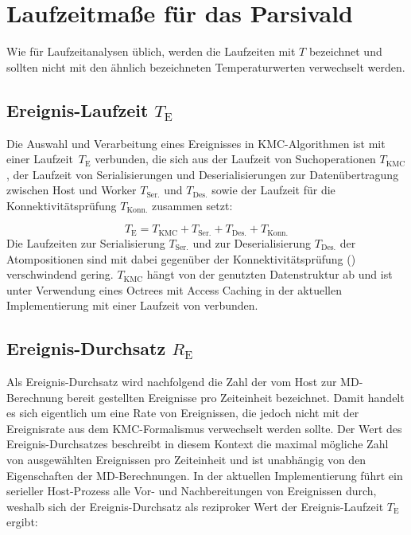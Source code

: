 \section{Laufzeitmaße für das Parsivald}

Wie für Laufzeitanalysen üblich, werden die Laufzeiten mit $T$ bezeichnet und sollten nicht mit den ähnlich bezeichneten Temperaturwerten verwechselt werden.

\subsection{Ereignis-Laufzeit $T_\text{E}$}

Die Auswahl und Verarbeitung eines Ereignisses in KMC-Algorithmen ist mit einer Laufzeit~$T_\text{E}$ verbunden, die sich aus der Laufzeit von Suchoperationen $T_\text{KMC}$, der Laufzeit von Serialisierungen und Deserialisierungen zur Datenübertragung zwischen Host und Worker $T_\text{Ser.}$ und $T_\text{Des.}$ sowie der Laufzeit für die Konnektivitätsprüfung $T_\text{Konn.}$ zusammen setzt:

\begin{equation}
T_\text{E} = T_\text{KMC} + T_\text{Ser.} + T_\text{Des.} + T_\text{Konn.}
\end{equation}
Die Laufzeiten zur Serialisierung $T_\text{Ser.}$ und zur Deserialisierung $T_\text{Des.}$ der Atompositionen sind mit  dabei gegenüber der Konnektivitätsprüfung () verschwindend gering.
$T_\text{KMC}$ hängt von der genutzten Datenstruktur ab und ist unter Verwendung eines Octrees mit Access Caching in der aktuellen Implementierung mit einer Laufzeit von  verbunden.

\subsection{Ereignis-Durchsatz $R_\text{E}$}

Als Ereignis-Durchsatz wird nachfolgend die Zahl der vom Host zur MD-Berechnung bereit gestellten Ereignisse pro Zeiteinheit bezeichnet.
Damit handelt es sich eigentlich um eine Rate von Ereignissen, die jedoch nicht mit der Ereignisrate aus dem KMC-Formalismus verwechselt werden sollte.
Der Wert des Ereignis-Durchsatzes beschreibt in diesem Kontext die maximal mögliche Zahl von ausgewählten Ereignissen pro Zeiteinheit und ist unabhängig von den Eigenschaften der MD-Berechnungen.
In der aktuellen Implementierung führt ein serieller Host-Prozess alle Vor- und Nachbereitungen von Ereignissen durch, weshalb sich der Ereignis-Durchsatz als reziproker Wert der Ereignis-Laufzeit $T_\text{E}$ ergibt:

